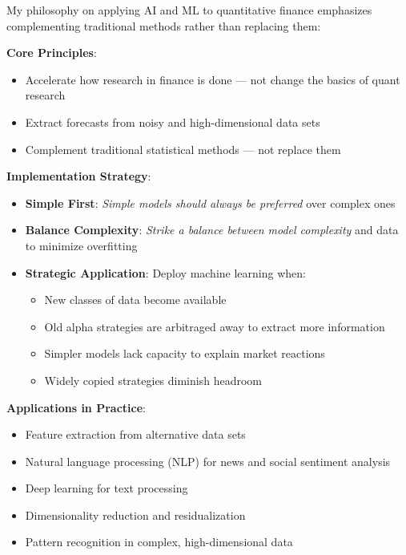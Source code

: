 \documentclass[11pt, letterpaper]{article}
\begin{document}
  My philosophy on applying AI and ML to quantitative finance emphasizes
  complementing traditional methods rather than replacing them:

  \textbf{Core Principles}:

  \begin{itemize}
    \item Accelerate how research in finance is done --- not change the basics
      of quant research

    \item Extract forecasts from noisy and high-dimensional data sets

    \item Complement traditional statistical methods --- not replace them
  \end{itemize}

  \textbf{Implementation Strategy}:

  \begin{itemize}
    \item \textbf{Simple First}: \textit{Simple models should always be preferred}
      over complex ones

    \item \textbf{Balance Complexity}: \textit{Strike a balance between model complexity}
      and data to minimize overfitting

    \item \textbf{Strategic Application}: Deploy machine learning when:

      \begin{itemize}
        \item New classes of data become available

        \item Old alpha strategies are arbitraged away to extract more information

        \item Simpler models lack capacity to explain market reactions

        \item Widely copied strategies diminish headroom
      \end{itemize}
  \end{itemize}

  \textbf{Applications in Practice}:

  \begin{itemize}
    \item Feature extraction from alternative data sets

    \item Natural language processing (NLP) for news and social sentiment
      analysis

    \item Deep learning for text processing

    \item Dimensionality reduction and residualization

    \item Pattern recognition in complex, high-dimensional data
  \end{itemize}
\end{document}
